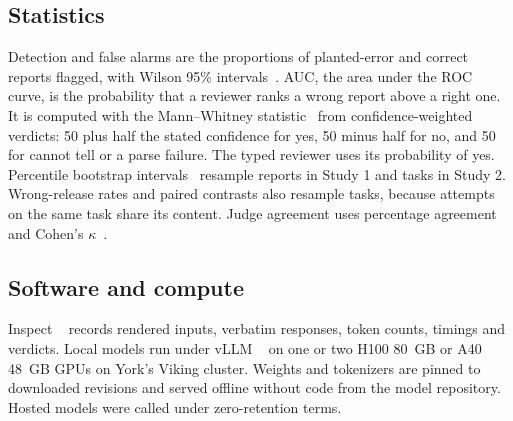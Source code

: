 \subsection{Statistics}
\label{sec:methods-stats}

Detection and false alarms are the proportions of planted-error and correct reports flagged, with Wilson 95\% intervals~\cite{wilson1927}. AUC, the area under the ROC curve, is the probability that a reviewer ranks a wrong report above a right one. It is computed with the Mann--Whitney statistic~\cite{hanley1982auc} from confidence-weighted verdicts: 50 plus half the stated confidence for yes, 50 minus half for no, and 50 for cannot tell or a parse failure. The typed reviewer uses its probability of yes. Percentile bootstrap intervals~\cite{efron1994bootstrap} resample reports in Study 1 and tasks in Study 2. Wrong-release rates and paired contrasts also resample tasks, because attempts on the same task share its content. Judge agreement uses percentage agreement and Cohen's $\kappa$~\cite{cohen1960kappa}.

\subsection{Software and compute}
\label{sec:methods-software}

Inspect ~\cite{inspect2024} records rendered inputs, verbatim responses, token counts, timings and verdicts. Local models run under vLLM ~\cite{kwon2023vllm} on one or two H100 80~GB or A40 48~GB GPUs on York's Viking cluster. Weights and tokenizers are pinned to downloaded revisions and served offline without code from the model repository. Hosted models were called under zero-retention terms.
